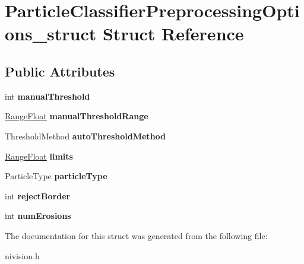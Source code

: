 \hypertarget{structParticleClassifierPreprocessingOptions__struct}{\section{\-Particle\-Classifier\-Preprocessing\-Options\-\_\-struct \-Struct \-Reference}
\label{structParticleClassifierPreprocessingOptions__struct}
}
\subsection*{\-Public \-Attributes}
\begin{DoxyCompactItemize}
\item 
\hypertarget{structParticleClassifierPreprocessingOptions__struct_aa8246a6e547e5313509168b4081ba6f1}{int {\bfseries manual\-Threshold}}\label{structParticleClassifierPreprocessingOptions__struct_aa8246a6e547e5313509168b4081ba6f1}

\item 
\hypertarget{structParticleClassifierPreprocessingOptions__struct_a078af5da5236dff6d3e38e0a1852cb54}{\hyperlink{structRangeFloat__struct}{\-Range\-Float} {\bfseries manual\-Threshold\-Range}}\label{structParticleClassifierPreprocessingOptions__struct_a078af5da5236dff6d3e38e0a1852cb54}

\item 
\hypertarget{structParticleClassifierPreprocessingOptions__struct_a7865ab1314bd942c7c2301b3dd670ff1}{\-Threshold\-Method {\bfseries auto\-Threshold\-Method}}\label{structParticleClassifierPreprocessingOptions__struct_a7865ab1314bd942c7c2301b3dd670ff1}

\item 
\hypertarget{structParticleClassifierPreprocessingOptions__struct_af2182f5e11d685a7528361d9700af617}{\hyperlink{structRangeFloat__struct}{\-Range\-Float} {\bfseries limits}}\label{structParticleClassifierPreprocessingOptions__struct_af2182f5e11d685a7528361d9700af617}

\item 
\hypertarget{structParticleClassifierPreprocessingOptions__struct_aefef6539a0531b91f54fa728aad7cd47}{\-Particle\-Type {\bfseries particle\-Type}}\label{structParticleClassifierPreprocessingOptions__struct_aefef6539a0531b91f54fa728aad7cd47}

\item 
\hypertarget{structParticleClassifierPreprocessingOptions__struct_a44250fa8e9699756a4258c3b81703bdd}{int {\bfseries reject\-Border}}\label{structParticleClassifierPreprocessingOptions__struct_a44250fa8e9699756a4258c3b81703bdd}

\item 
\hypertarget{structParticleClassifierPreprocessingOptions__struct_ab42c35852cf91289b9ad6c3adb76863b}{int {\bfseries num\-Erosions}}\label{structParticleClassifierPreprocessingOptions__struct_ab42c35852cf91289b9ad6c3adb76863b}

\end{DoxyCompactItemize}


\-The documentation for this struct was generated from the following file\-:\begin{DoxyCompactItemize}
\item 
nivision.\-h\end{DoxyCompactItemize}
